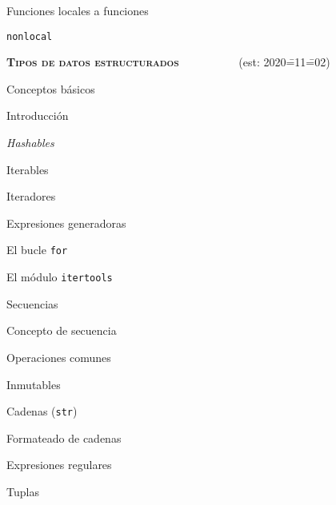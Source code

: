 \begin{longenum}
\begin{longenum}
\begin{longenum}
\begin{longenum}
\begin{longenum}
                \end{longenum}
            \end{longenum}
            \item Funciones locales a funciones
            \begin{longenum}
                \item \texttt{nonlocal}
            \end{longenum}
        \end{longenum}
    \end{longenum}
    \item \textbf{\textsc{Tipos de datos estructurados}} \ \ \ \ \ \ \ \ \ \ (est: 2020\==11\==02)
    \begin{longenum}
        \item Conceptos básicos
        \begin{longenum}
            \item Introducción
            \item \textit{Hashables}
            \item Iterables
            \item Iteradores
            \begin{longenum}
                \item Expresiones generadoras
                \item El bucle \texttt{for}
                \item El módulo \texttt{itertools}
            \end{longenum}
        \end{longenum}
        \item Secuencias
        \begin{longenum}
            \item Concepto de secuencia
            \item Operaciones comunes
            \item Inmutables
            \begin{longenum}
                \item Cadenas (\texttt{str})
                \begin{longenum}
                    \item Formateado de cadenas
                    \item Expresiones regulares 
                \end{longenum}
                \item Tuplas

\end{longenum}
\end{longenum}
\end{longenum}
\end{longenum}
